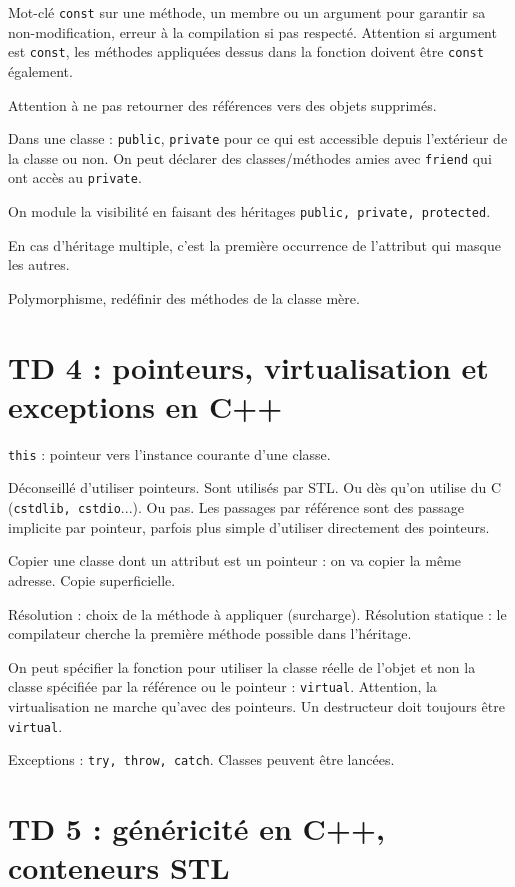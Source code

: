 \documentclass[french]{article}
\def\code#1{\texttt{#1}}
\begin{document}
Mot-clé \code{const} sur une méthode, un membre ou un argument pour garantir sa non-modification, erreur à la compilation si pas respecté. Attention si argument est \code{const}, les méthodes appliquées dessus dans la fonction doivent être \code{const} également.

Attention à ne pas retourner des références vers des objets supprimés.

Dans une classe : \code{public}, \code{private} pour ce qui est accessible depuis l'extérieur de la classe ou non. On peut déclarer des classes/méthodes amies avec \code{friend} qui ont accès au \code{private}.

On module la visibilité en faisant des héritages \code{public, private, protected}.

En cas d'héritage multiple, c’est la première occurrence de l’attribut qui masque les autres.

Polymorphisme, redéfinir des méthodes de la classe mère.


\section*{TD 4 : pointeurs, virtualisation et exceptions en C++}

\code{this} : pointeur vers l'instance courante d'une classe.

Déconseillé d'utiliser pointeurs. Sont utilisés par STL. Ou dès qu'on utilise du C (\code{cstdlib, cstdio}...). Ou pas. Les passages par référence sont des passage implicite par pointeur, parfois plus simple d'utiliser directement des pointeurs.

Copier une classe dont un attribut est un pointeur : on va copier la même adresse. Copie superficielle.

Résolution : choix de la méthode à appliquer (surcharge). Résolution statique : le compilateur cherche la première méthode possible dans l'héritage.

On peut spécifier la fonction pour utiliser la classe réelle de l'objet et non la classe spécifiée par la référence ou le pointeur : \code{virtual}. Attention, la virtualisation ne marche qu'avec des pointeurs. Un destructeur doit toujours être \code{virtual}.

Exceptions : \code{try, throw, catch}. Classes peuvent être lancées.

\section*{TD 5 : généricité en C++, conteneurs STL}
\end{document}
